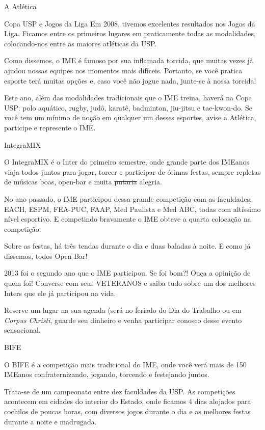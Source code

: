 \begin{secao}{A Atlética}
\begin{subsecao}{Copa USP e Jogos da Liga}
Em 2008, tivemos excelentes resultados nos Jogos da Liga. Ficamos entre os
primeiros lugares em praticamente todas as modalidades, colocando-nos entre as
maiores atléticas da USP.

Como dissemos, o IME é famoso por sua inflamada torcida, que muitas vezes já
ajudou nossas equipes nos momentos mais difíceis. Portanto, se você pratica
esporte terá muitas opções e, caso você não jogue nada, junte-se à nossa torcida!

Este ano, além das modalidades tradicionais que o IME treina, haverá na Copa 
USP: polo aquático, rugby, judô, karatê, badminton, jiu-jitsu e tae-kwon-do. Se 
você tem um mínimo de noção em qualquer um desses esportes, avise a Atlética,
participe e represente o IME.

\end{subsecao}
\begin{subsecao}{IntegraMIX}

O IntegraMIX é o Inter do primeiro semestre, onde grande parte dos IMEanos
viaja todos juntos para jogar, torcer e participar de ótimas festas, sempre
repletas de músicas boas, open-bar e muita \sout{putaria} alegria.

No ano passado, o IME participou dessa grande competição com as faculdades:
EACH, ESPM, FEA-PUC, FAAP, Med Paulista e Med ABC, todas com altíssimo nível
esportivo. E competindo bravamente o IME obteve a quarta colocação na
competição.

Sobre as festas, há três tendas durante o dia e duas baladas à noite.
E como já dissemos, todos Open Bar!

2013 foi o segundo ano que o IME participou. Se foi bom?! Ouça a opinição de 
quem foi! Converse com seus VETERANOS e saiba tudo sobre um dos melhores Inters
que ele já participou na vida.

Reserve um lugar na sua agenda (será no feriado do Dia do Trabalho ou em
{\it Corpus Christi}, guarde seu dinheiro e venha participar conosco 
desse evento sensacional.


\end{subsecao}
\begin{subsecao}{BIFE}

O BIFE é a competição mais tradicional do IME, onde você verá mais de 150 
IMEanos confraternizando, jogando, torcendo e festejando juntos.

Trata-se de um campeonato entre dez faculdades da USP. As competições acontecem em cidades do interior do Estado, onde ficamos 4 dias
alojados para cochilos de poucas horas, com diversos jogos durante o dia e as
melhores festas durante a noite e madrugada.


\end{subsecao}
\end{secao}
